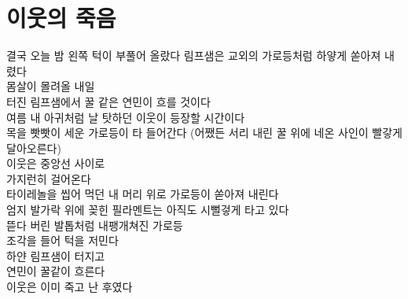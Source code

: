 \hypertarget{uxc774uxc6c3uxc758-uxc8fduxc74c}{%

\chapter{이웃의 죽음}\label{uxc774uxc6c3uxc758-uxc8fduxc74c}}



결국 오늘 밤 왼쪽 턱이 부풀어 올랐다 림프샘은 교외의 가로등처럼 하얗게 쏟아져 내렸다\\

몸살이 몰려올 내일\\

터진 림프샘에서 꿀 같은 연민이 흐를 것이다\\

여름 내 아귀처럼 날 탓하던 이웃이 등장할 시간이다\\

목을 빳빳이 세운 가로등이 타 들어간다 (어쨌든 서리 내린 꿀 위에 네온 사인이 빨갛게 달아오른다)\\

이웃은 중앙선 사이로\\

가지런히 걸어온다\\

타이레놀을 씹어 먹던 내 머리 위로 가로등이 쏟아져 내린다\\

엄지 발가락 위에 꽂힌 필라멘트는 아직도 시뻘겋게 타고 있다\\

뜯다 버린 발톱처럼 내팽개쳐진 가로등\\

조각을 들어 턱을 저민다\\

하얀 림프샘이 터지고\\

연민이 꿀같이 흐른다\\

이웃은 이미 죽고 난 후였다

